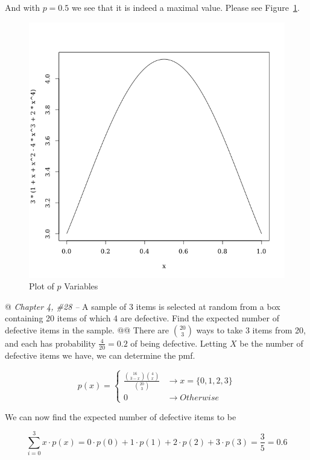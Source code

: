 \documentclass[10pt]{article}
\begin{document}
\begin{easylist}[enumerate]
    And with $p=0.5$ we see that it is indeed a maximal value. Please see Figure~\ref{fig:1.2}.

    \begin{figure}[!ht]
        \centering
        \includegraphics[scale=0.5]{./img/ps5_1_1.png}
        \caption{Plot of $p$ Variables}
        \label{fig:1.2}
    \end{figure}

    @ \textit{Chapter 4, \#28 --} A sample of 3 items is selected at random from a box containing 20 items of which 4
    are defective. Find the expected number of defective items in the sample.
    @@ There are $\binom{20}{3}$ ways to take 3 items from 20, and each has probability $\frac{4}{20} = 0.2$ of being
    defective. Letting $X$ be the number of defective items we have, we can determine the pmf.

        \[
            p(x) =
            \begin{cases}
                \frac{\binom{16}{3-x} \binom{4}{x}}{\binom{20}{3}} &\to x=\{0, 1, 2, 3\}\\
                0 &\to Otherwise
            \end{cases}
        \]

    We can now find the expected number of defective items to be

        \[
            \sum_{i=0}^3 x \cdot p(x) = 0 \cdot p(0) + 1 \cdot p(1) + 2 \cdot p(2) + 3 \cdot p(3) = \frac{3}{5} =
            \boxed{0.6}
        \]


\end{easylist}
\end{document}
